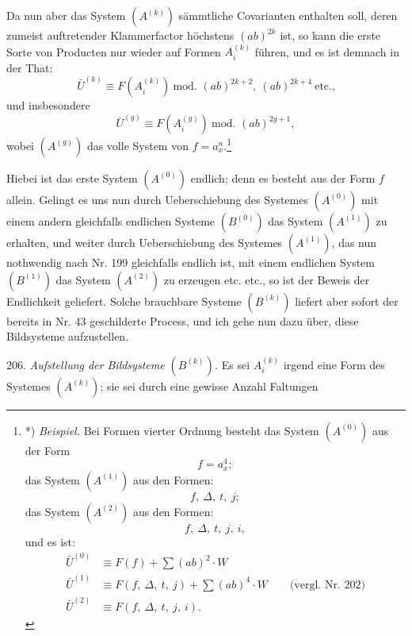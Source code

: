 Da nun aber das System $(A^{(k)})$ sämmtliche Covarianten enthalten
soll, deren zumeist auftretender Klammerfactor höchstens $(ab)^{2k}$
ist, so kann die erste Sorte von Producten nur wieder auf Formen
$A_i^{(k)}$ führen, und es ist demnach in der That:
\[ \bar U^{(k)} \equiv F(A_i^{(k)}) \ \text{mod. } (ab)^{2k+2},\ (ab)^{2k+4}\ \text{etc.,} \]
und insbesondere
\[ \bar U^{(g)} \equiv F(A_i^{(g)}) \ \text{mod. } (ab)^{2g+1}, \]
wobei $(A^{(g)})$ das volle System von $f=a_x^n$.\footnote{*)
\textit{Beispiel.} Bei Formen vierter Ordnung besteht das System
$(A^{(0)})$ aus der Form
\[ f = a_x^4; \]
das System $(A^{(1)})$ aus den Formen:
\[ f,\ \Delta,\ t,\ j; \]
das System $(A^{(2)})$ aus den Formen:
\[ f,\ \Delta,\ t,\ j,\ i, \]
und es ist:
\[
\begin{aligned}
\bar U^{(0)} &\equiv F(f) + \sum (ab)^2\cdot W\\
\bar U^{(1)} &\equiv F(f,\ \Delta,\ t,\ j) + \sum (ab)^4\cdot W \qquad\text{(vergl. Nr. 202)}\\
\bar U^{(2)} &\equiv F(f,\ \Delta,\ t,\ j,\ i).
\end{aligned}
\]}

Hiebei ist das erste System $(A^{(0)})$ endlich; denn es besteht aus der
Form $f$ allein. Gelingt es uns nun durch Ueberschiebung des Systemes
$(A^{(0)})$ mit einem andern gleichfalls endlichen Systeme $(B^{(0)})$
das System $(A^{(1)})$ zu erhalten, und weiter durch Ueberschiebung des
Systemes $(A^{(1)})$, das nun nothwendig nach Nr. 199 gleichfalls
endlich ist, mit einem endlichen System $(B^{(1)})$ das System
$(A^{(2)})$ zu erzeugen etc. etc., so ist der Beweis der Endlichkeit
geliefert. Solche brauchbare Systeme $(B^{(k)})$ liefert aber sofort der
bereits in Nr. 43 geschilderte Process, und ich gehe nun dazu über,
diese Bildsysteme aufzustellen.

206. \textit{Aufstellung der Bildsysteme $(B^{(k)})$.} Es sei $A_i^{(k)}$
irgend eine Form des Systemes $(A^{(k)})$; sie sei durch eine gewisse
Anzahl Faltungen


